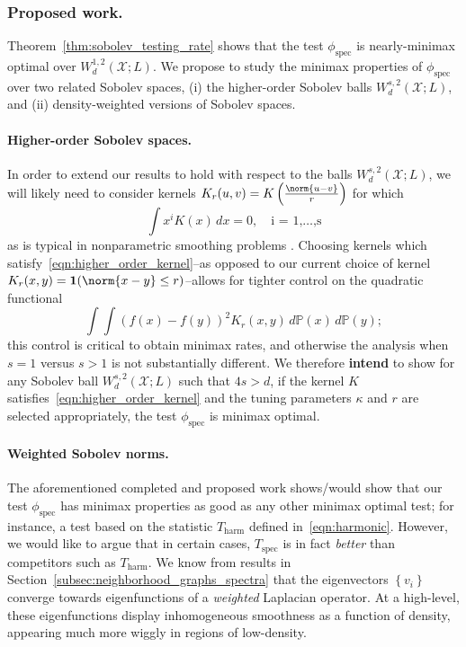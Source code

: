 \documentclass{article}
\newcommand{\set}[1]{\left\{#1\right\}}
\newcommand{\1}{\mathbf{1}}
\newcommand{\Pbb}{\mathbb{P}}
\theoremstyle{alden}
\theoremstyle{aldenthm}
\theoremstyle{definition}
\theoremstyle{remark}
\begin{document}
\subsubsection{Proposed work.}

Theorem~\ref{thm:sobolev_testing_rate} shows that the test $\phi_{\mathrm{spec}}$ is nearly-minimax optimal over $W_d^{1,2}(\mathcal{X};L)$. We propose to study the minimax properties of $\phi_{\mathrm{spec}}$ over two related Sobolev spaces, (i) the higher-order Sobolev balls $W_d^{s,2}(\mathcal{X};L)$, and (ii) density-weighted versions of Sobolev spaces.

\paragraph{Higher-order Sobolev spaces.}
In order to extend our results to hold with respect to the balls $W_d^{s,2}(\mathcal{X};L)$, we will likely need to consider kernels $K_r(u,v) = K\left(\frac{\norm{u - v}}{r}\right)$ for which
\begin{equation}
\label{eqn:higher_order_kernel}
\int x^i K(x) \,dx = 0, \quad \textrm{i = 1,\ldots,s}
\end{equation}
as is typical in nonparametric smoothing problems \cite{tsybakov08}. Choosing kernels which satisfy~\eqref{eqn:higher_order_kernel}--as opposed to our current choice of kernel $K_r(x,y) = \1(\norm{x - y} \leq r)$--allows for tighter control on the quadratic functional
\begin{equation*}
\int \int (f(x) - f(y))^2 K_r(x,y) \,d\Pbb(x) \,d\Pbb(y);
\end{equation*}
this control is critical to obtain minimax rates, and otherwise the analysis when $s = 1$ versus $s > 1$ is not substantially different. We therefore \textbf{intend} to show for any Sobolev ball $W_d^{s,2}(\mathcal{X};L)$ such that $4s > d$, if the kernel $K$ satisfies~\eqref{eqn:higher_order_kernel} and the tuning parameters $\kappa$ and $r$ are selected appropriately, the test $\phi_{\mathrm{spec}}$ is minimax optimal.

\paragraph{Weighted Sobolev norms.}

The aforementioned completed and proposed work shows/would show that our test $\phi_{\mathrm{spec}}$ has minimax properties as good as any other minimax optimal test; for instance, a test based on the statistic $T_{\mathrm{harm}}$ defined in~\eqref{eqn:harmonic}. However, we would like to argue that in certain cases, $T_{\textrm{spec}}$ is in fact \textit{better} than competitors such as $T_{\textrm{harm}}$. We know from results in Section~\ref{subsec:neighborhood_graphs_spectra} that the eigenvectors $\set{v_i}$ converge towards eigenfunctions of a \emph{weighted} Laplacian operator. At a high-level, these eigenfunctions display inhomogeneous smoothness as a function of density, appearing much more wiggly in regions of low-density. 
\end{document}
